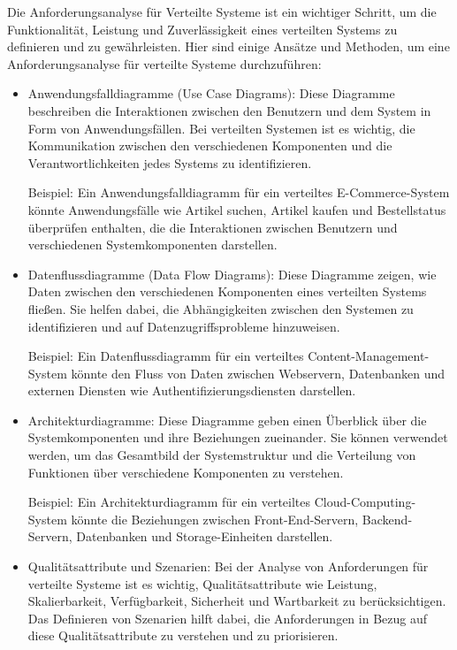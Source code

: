 Die Anforderungsanalyse für Verteilte Systeme ist ein wichtiger Schritt, um die Funktionalität, Leistung und Zuverlässigkeit eines verteilten Systems zu definieren und zu gewährleisten. Hier sind einige Ansätze und Methoden, um eine Anforderungsanalyse für verteilte Systeme durchzuführen:
\begin{itemize}  
\item Anwendungsfalldiagramme (Use Case Diagrams): Diese Diagramme beschreiben die Interaktionen zwischen den Benutzern und dem System in Form von Anwendungsfällen. Bei verteilten Systemen ist es wichtig, die Kommunikation zwischen den verschiedenen Komponenten und die Verantwortlichkeiten jedes Systems zu identifizieren.

Beispiel: Ein Anwendungsfalldiagramm für ein verteiltes E-Commerce-System könnte Anwendungsfälle wie Artikel suchen, Artikel kaufen und Bestellstatus überprüfen enthalten, die die Interaktionen zwischen Benutzern und verschiedenen Systemkomponenten darstellen.

\item Datenflussdiagramme (Data Flow Diagrams): Diese Diagramme zeigen, wie Daten zwischen den verschiedenen Komponenten eines verteilten Systems fließen. Sie helfen dabei, die Abhängigkeiten zwischen den Systemen zu identifizieren und auf Datenzugriffsprobleme hinzuweisen.

Beispiel: Ein Datenflussdiagramm für ein verteiltes Content-Management-System könnte den Fluss von Daten zwischen Webservern, Datenbanken und externen Diensten wie Authentifizierungsdiensten darstellen.

\item Architekturdiagramme: Diese Diagramme geben einen Überblick über die Systemkomponenten und ihre Beziehungen zueinander. Sie können verwendet werden, um das Gesamtbild der Systemstruktur und die Verteilung von Funktionen über verschiedene Komponenten zu verstehen.

Beispiel: Ein Architekturdiagramm für ein verteiltes Cloud-Computing-System könnte die Beziehungen zwischen Front-End-Servern, Backend-Servern, Datenbanken und Storage-Einheiten darstellen.

\item Qualitätsattribute und Szenarien: Bei der Analyse von Anforderungen für verteilte Systeme ist es wichtig, Qualitätsattribute wie Leistung, Skalierbarkeit, Verfügbarkeit, Sicherheit und Wartbarkeit zu berücksichtigen. Das Definieren von Szenarien hilft dabei, die Anforderungen in Bezug auf diese Qualitätsattribute zu verstehen und zu priorisieren.


\end{itemize}
